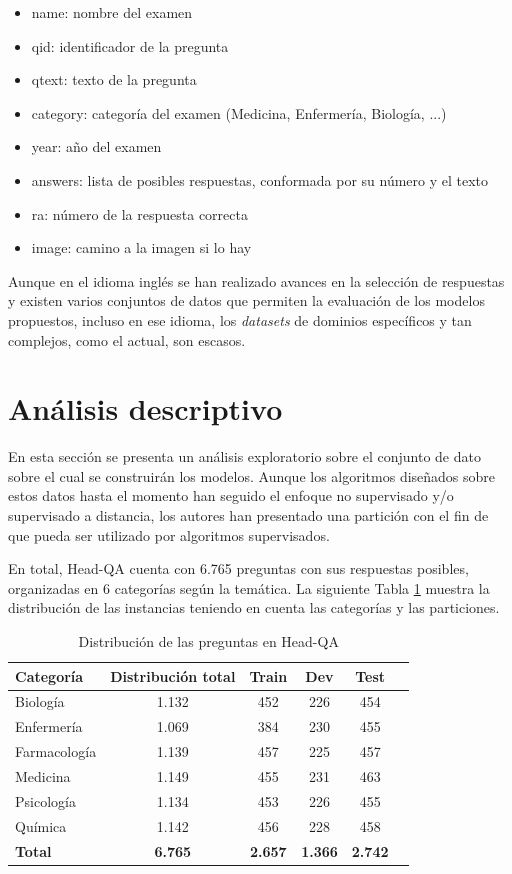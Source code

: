 \begin{itemize}
  \item name: nombre del examen
  \item qid: identificador de la pregunta
  \item qtext: texto de la pregunta
  \item category: categoría del examen (Medicina, Enfermería, Biología, ...)
  \item year: año del examen
  \item answers: lista de posibles respuestas, conformada por su número y el texto
  \item ra: número de la respuesta correcta
  \item image: camino a la imagen si lo hay
\end{itemize}

Aunque en el idioma inglés se han realizado avances en la selección de respuestas y existen varios conjuntos de datos que permiten la evaluación de los modelos propuestos, incluso en ese idioma, los \textit{datasets} de dominios específicos y tan complejos, como el actual, son escasos. 

\section{Análisis descriptivo}

En esta sección se presenta un análisis exploratorio sobre el conjunto de dato sobre el cual se construirán los modelos. Aunque los algoritmos diseñados sobre estos datos hasta el momento han seguido el enfoque no supervisado y/o supervisado a distancia, los autores han presentado una partición con el fin de que pueda ser utilizado por algoritmos supervisados.

En total, Head-QA cuenta con 6.765 preguntas con sus respuestas posibles, organizadas en 6 categorías según la temática. La siguiente Tabla \ref{size} muestra la distribución de las instancias teniendo en cuenta las categorías y las particiones.

\begin{table}[!tb]
  \begin{center}
    \caption{Distribución de las preguntas en Head-QA}
    \begin{tabular}{l|c|c|c|c|c}
      \textbf{Categoría} & \textbf{Distribución total} & \textbf{Train} & \textbf{Dev} & \textbf{Test} \\
      \hline
      Biología & 1.132 & 452 & 226 & 454 \\
      Enfermería & 1.069 & 384 & 230 & 455 \\
      Farmacología & 1.139 & 457 & 225 & 457 \\
      Medicina & 1.149 & 455 & 231 & 463 \\
      Psicología & 1.134 & 453 & 226 & 455 \\
      Química & 1.142 & 456 & 228 & 458 \\ 
      \textbf{Total} & \textbf{6.765} & \textbf{2.657} & \textbf{1.366} & \textbf{2.742}\\
    \end{tabular}
  \end{center}
  \label{size}
\end{table}

